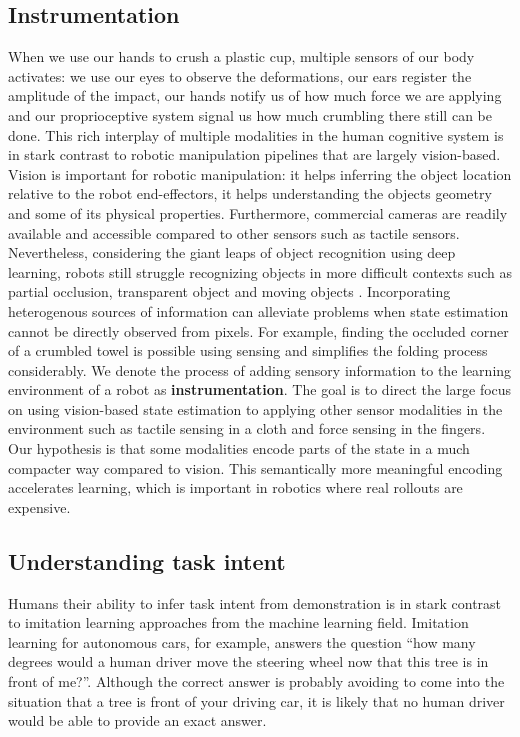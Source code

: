 \documentclass[\home/main.tex]{subfiles}
\begin{document}
\subsection{Instrumentation}
When we use our hands to crush a plastic cup, multiple sensors of our body activates: we use our eyes to observe the deformations, our ears register the amplitude of the impact, our hands notify us of how much force we are applying and our proprioceptive system signal us how much crumbling there still can be done. This rich interplay of multiple modalities in the human cognitive system is in stark contrast to robotic manipulation pipelines that are largely vision-based.  Vision is important for robotic manipulation: it helps inferring the object location relative to the robot end-effectors, it helps understanding the objects geometry and some of its physical properties. Furthermore, commercial cameras are readily available and accessible compared to other sensors such as tactile sensors. Nevertheless, considering the giant leaps of object recognition using deep learning, robots still struggle recognizing objects in more difficult contexts such as partial occlusion, transparent object and moving objects \autocite{Guo2014,sajjan2019cleargrasp,Ojha2015}. 
Incorporating heterogenous sources of information can alleviate problems when state estimation cannot be directly observed from pixels. For example, finding the occluded corner of a crumbled towel is possible using sensing and simplifies the folding process considerably. 
We denote the process of adding sensory information to the learning environment of a robot as \textbf{instrumentation}. The goal is to direct the large focus on using vision-based state estimation to applying other sensor modalities in the environment such as tactile sensing in a cloth and force sensing in the fingers. Our hypothesis is that some modalities encode parts of the state in a much compacter way compared to vision. This semantically more meaningful encoding accelerates learning, which is important in robotics where real rollouts are expensive. 

\subsection{Understanding task intent}
Humans their ability to infer task intent from demonstration is in stark contrast to imitation learning approaches from the machine learning field. Imitation learning for autonomous cars, for example, answers the question \enquote{how many degrees would a human driver move the steering wheel now that this tree is in front of me?}. Although the correct answer is probably avoiding to come into the situation that a tree is front of your driving car, it is likely that no human driver would be able to provide an exact answer. 
\end{document}
